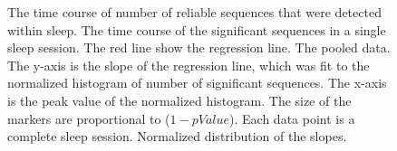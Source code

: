 \begin{figure}[H!]
\centering
{}
\caption[Sleep Sequences]{The time course of number of reliable sequences that were detected within sleep.  The time course of the significant sequences in a single sleep session. The red line show the regression line.   The pooled data. The y-axis is the slope of the regression line, which was fit to the normalized histogram of number of significant sequences. The x-axis is the peak value of the normalized histogram. The size of the markers are proportional to ($1 - p Value$). Each data point is a complete sleep session.  Normalized distribution of the slopes.}
\label{fig:slpseq}
\end{figure}


